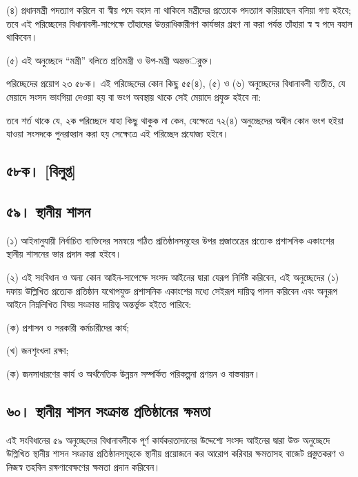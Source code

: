 \documentclass[11pt]{article}
\begin{document}
(৪) প্রধানমন্ত্রী পদত্যাগ করিলে বা স্বীয় পদে বহাল না থাকিলে মন্ত্রীদের
    প্রত্যেকে পদত্যাগ করিয়াছেন বলিয়া গণ্য হইবে; তবে এই পরিচ্ছেদের
    বিধানাবলী-সাপেক্ষে তাঁহাদের উত্তরাধিকারীগণ কার্যভার গ্রহণ না করা পর্যন্ত
    তাঁহারা স্ব স্ব পদে বহাল থাকিবেন।

(৫) এই অনুচ্ছেদে “মন্ত্রী” বলিতে প্রতিমন্ত্রী ও উপ-মন্ত্রী অন্তভর্ুক্ত।

পরিচ্ছেদের প্রয়োগ ২৩ ৫৮ক। এই পরিচ্ছেদের কোন কিছু ৫৫(৪), (৫) ও (৬) অনুচ্ছেদের
বিধানাবলী ব্যতীত, যে মেয়াদে সংসদ ভাংগিয়া দেওয়া হয় বা ভংগ অবস্থায় থাকে
সেই মেয়াদে প্রযুক্ত হইবে না:

তবে শর্ত থাকে যে, ২ক পরিচ্ছেদে যাহা কিছু থাকুক না কেন, যেক্ষেত্রে ৭২(৪)
অনুচ্ছেদের অধীন কোন ভংগ হইয়া যাওয়া সংসদকে পুনরাহ্বান করা হয় সেক্ষেত্রে এই
পরিচ্ছেদ প্রযোজ্য হইবে।

\subsection{৫৮ক। [বিলুপ্ত]}
\label{sec:org6357b38}

\subsection{৫৯। স্থানীয় শাসন}
\label{sec:org8ea106d}
(১) আইনানুযায়ী নির্বাচিত ব্যক্তিদের সমন্বয়ে গঠিত প্রতিষ্ঠানসমূহের উপর
    প্রজাতন্ত্রের প্রত্যেক প্রশাসনিক একাংশের স্থানীয় শাসনের ভার প্রদান করা হইবে।

(২) এই সংবিধান ও অন্য কোন আইন-সাপেক্ষে সংসদ আইনের দ্বারা যেরূপ নির্দিষ্ট
    করিবেন, এই অনুচ্ছেদের (১) দফায় উল্লিখিত প্রত্যেক প্রতিষ্ঠান যথোপযুক্ত প্রশাসনিক
    একাংশের মধ্যে সেইরূপ দায়িত্ব পালন করিবেন এবং অনুরূপ আইনে নিম্নলিখিত বিষয়
    সংক্রান্ত দায়িত্ব অন্তর্ভুক্ত হইতে পারিবে:

(ক) প্রশাসন ও সরকারী কর্মচারীদের কার্য;

(খ) জনশৃংখলা রক্ষা;

(ক) জনসাধারণের কার্য ও অর্থনৈতিক উন্নয়ন সম্পর্কিত পরিকল্পনা প্রণয়ন ও
    বাস্তবায়ন।

\subsection{৬০। স্থানীয় শাসন সংক্রান্ত প্রতিষ্ঠানের ক্ষমতা}
\label{sec:orgdd0dd83}
এই সংবিধানের ৫৯ অনুচ্ছেদের বিধানাবলীকে পূর্ণ কার্যকরতাদানের উদ্দেশ্যে সংসদ
আইনের দ্বারা উক্ত অনুচ্ছেদে উল্লিখিত স্থানীয় শাসন সংক্রান্ত প্রতিষ্ঠানসমূহকে
স্থানীয় প্রয়োজনে কর আরোপ করিবার ক্ষমতাসহ বাজেট প্রস্তুতকরণ ও নিজস্ব তহবিল
রক্ষণাবেক্ষণের ক্ষমতা প্রদান করিবেন।
\end{document}
